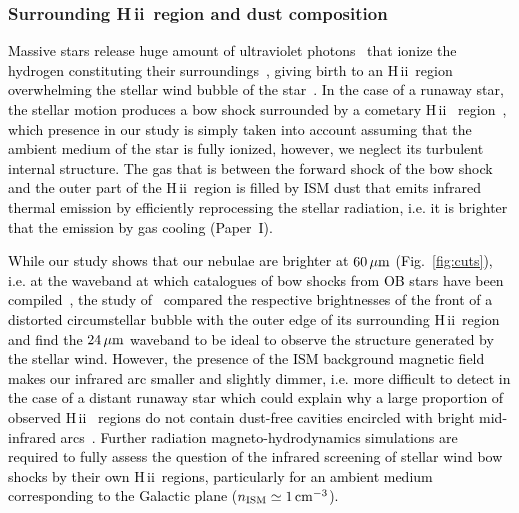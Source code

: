 \documentclass[useAMS,usenatbib]{mn2e}
\newcommand\hii{H\,{\sc ii} \,}
\begin{document}
\subsubsection{Surrounding \hii region and dust composition}
\label{sect:hii_region}


\textcolor{black}{
Massive stars release huge amount of ultraviolet 
photons~\citep{diazmiller_apj_501_1998} that ionize the hydrogen constituting  
their surroundings~\citep{dyson_ass_35_1975}, giving birth to an \hii region 
overwhelming the stellar wind bubble of the 
star~\citep{weaver_apj_218_1977,vanmarle_phd_2006}. In the case of a runaway 
star, the stellar motion produces a bow shock surrounded by a cometary \hii 
region~\citep{raga_apj_300_1086,maclow_apj_369_1991,raga_rmxaa_33_1997, 
arthur_apjs_165_2006,zhu_apj_812_2015}, which presence in our study is simply 
taken into account assuming that the ambient medium of the star is fully 
ionized, however, we neglect its turbulent internal structure. The gas that is 
between the forward shock of the bow shock and the outer part of the \hii region 
is filled by ISM dust that emits infrared thermal emission by efficiently 
reprocessing the stellar radiation, i.e. it is brighter that the emission by 
gas cooling (Paper~I). 
}


\textcolor{black}{
While our study shows that our nebulae are brighter at $60\, \mu \rm m$ 
(Fig.~\ref{fig:cuts}), i.e. at the waveband at which catalogues of bow shocks 
from OB stars have been 
compiled~\citep{buren_apj_329_1988,vanburen_aj_110_1995,
noriegacrespo_aj_113_1997}, the study of~\citet{mackey_aa_586_2016} compared the 
respective brightnesses of the front of a distorted circumstellar bubble with 
the outer edge of its surrounding \hii region and find the $24\, \mu \rm m$ 
waveband to be ideal to observe the structure generated by the stellar wind. 
However, the presence of the ISM background magnetic field makes our infrared 
arc  smaller and slightly dimmer, i.e. more difficult to detect in the case of a 
distant runaway star which could explain why a large proportion of observed \hii 
regions do not contain dust-free cavities encircled with bright mid-infrared 
arcs~\citep{sharpless_apj_1959,churchwell_apj_649_2006,watcher_aj_139_2010,
simpson_mnras_424_2012}. Further radiation magneto-hydrodynamics simulations are 
required to fully assess the question of the infrared screening of stellar wind bow shocks by 
their own \hii regions, particularly for an ambient medium corresponding to the 
Galactic plane ($n_{\rm ISM}\simeq1\, \rm cm^{-3}$). 
}
\end{document}
